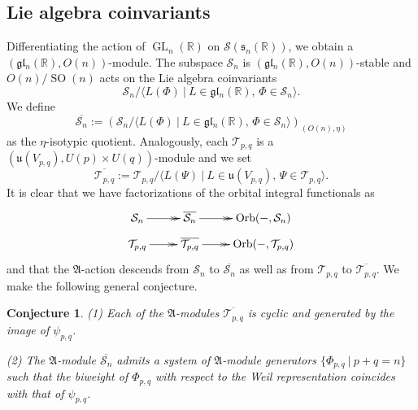 \documentclass[reqno, 11pt]{amsart} %
\numberwithin{equation}{section}
\theoremstyle{plain}
\newtheorem{conjecture}[theorem]{Conjecture}
\theoremstyle{definition}
\theoremstyle{remark}
\newcommand{\ov}{\overline}
\newcommand{\mbR}{\mathbb{R}}
\newcommand{\mcS}{\mathcal{S}}
\newcommand{\mcT}{\mathcal{T}}
\newcommand{\mfA}{\mathfrak{A}}
\newcommand{\mfg}{\mathfrak{g}}
\newcommand{\mfl}{\mathfrak{l}}
\newcommand{\mfs}{\mathfrak{s}}
\newcommand{\mfu}{\mathfrak{u}}
\newcommand{\mfgl}{\mfg\mfl}
\newcommand{\lie}[1]{ \mathfrak{#1}}
\DeclareMathOperator{\GL}{GL}
\DeclareMathOperator{\SO}{SO}
\newcommand{\Orb}{\mathrm{Orb}}
\newcommand{\mn}{\medskip \noindent}
\begin{document}
\subsection{Lie algebra coinvariants}

Differentiating the action of $\GL_n(\mbR)$ on $\mcS(\mfs_n(\mbR))$, we obtain a $(\mfgl_n(\mbR), O(n))$-module. The subspace $\mcS_n$ is $(\mfgl_n(\mbR), O(n))$-stable and $O(n)/\SO(n)$ acts on the Lie algebra coinvariants
$$ \mcS_n \big/\langle L(Φ) \ | \ L\in \mfgl_n(\mbR),\, Φ\in \mcS_n\rangle.$$
We define
\begin{equation}\label{eq:def_bar_S_n}
\ov {\mcS_n} := \left( \mcS_n \big/\langle L(Φ) \ | \ L\in \mfgl_n(\mbR),\, Φ\in \mcS_n\rangle \right)_{(O(n),η)}
\end{equation}
as the $\eta$-isotypic quotient.
Analogously, each $\mcT_{p,q}$ is a $(\mfu(V_{p,q}), U(p)\times U(q))$-module and we set
\begin{equation}\label{eq:def_bar_T_pq}
\ov {\mcT_{p,q}} := \mcT_{p,q} \Big/\langle L(Ψ) \ | \ L\in \mfu(V_{p,q}),\, Ψ\in \mcT_{p,q}\rangle.
\end{equation}
It is clear that we have factorizations of the orbital integral functionals as
\begin{equation}
\xymatrix@R=2mm{
\mcS_n \ar@{->>}[r] & \ov{\mcS_n} \ar@{->>}[r] & \Orb(-,\mcS_n)\\
\mcT_{p,q} \ar@{->>}[r] & \ov{\mcT_{p,q}} \ar@{->>}[r] & \Orb(-,\mcT_{p,q})
}
\end{equation}
and that the $\mfA$-action descends from $\mcS_n$ to $\ov{\mcS_n}$ as well as from $\mcT_{p,q}$ to $\ov{\mcT_{p,q}}$. We make the following general conjecture.
\begin{conjecture}\label{conj:cyclic_coinvariants}  (1) Each of the $\mfA$-modules $\ov{\mcT_{p,q}}$ is cyclic and generated by the image of $ψ_{p,q}$.

\mn (2) The $\mfA$-module $\overline{\mathcal S_n}$ admits a system of $\lie A$-module generators $\{ \Phi_{p,q} \ | \ p+q = n\}$ such that the biweight of $\Phi_{p,q}$ with respect to the Weil representation coincides with that of $\psi_{p,q}$.
\end{conjecture}
\end{document}
